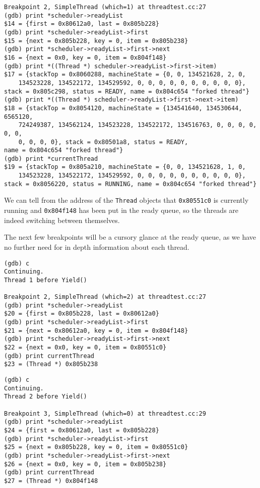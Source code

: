 \documentclass[letterpaper, 10pt]{article}
\begin{document}
\begin{enumerate}
{\begin{verbatim}
Breakpoint 2, SimpleThread (which=1) at threadtest.cc:27
(gdb) print *scheduler->readyList
$14 = {first = 0x80612a0, last = 0x805b228}
(gdb) print *scheduler->readyList->first
$15 = {next = 0x805b228, key = 0, item = 0x805b238}
(gdb) print *scheduler->readyList->first->next
$16 = {next = 0x0, key = 0, item = 0x804f148}
(gdb) print *((Thread *) scheduler->readyList->first->item)
$17 = {stackTop = 0x8060288, machineState = {0, 0, 134521628, 2, 0,
	134523228, 134522172, 134529592, 0, 0, 0, 0, 0, 0, 0, 0, 0, 0},
stack = 0x805c298, status = READY, name = 0x804c654 "forked thread"}
(gdb) print *((Thread *) scheduler->readyList->first->next->item)
$18 = {stackTop = 0x8054120, machineState = {134541640, 134530644, 6565120,
	724249387, 134562124, 134523228, 134522172, 134516763, 0, 0, 0, 0, 0, 0,
	0, 0, 0, 0}, stack = 0x80501a8, status = READY,
name = 0x804c654 "forked thread"}
(gdb) print *currentThread
$19 = {stackTop = 0x805a210, machineState = {0, 0, 134521628, 1, 0,
	134523228, 134522172, 134529592, 0, 0, 0, 0, 0, 0, 0, 0, 0, 0},
stack = 0x8056220, status = RUNNING, name = 0x804c654 "forked thread"}
	\end{verbatim}

	We can tell from the address of the {\tt Thread} objects that {\tt 0x80551c0} is currently running and {\tt 0x804f148} has been put in the ready queue, so the threads are indeed switching between themselves.

	The next few breakpoints will be a cursory glance at the ready queue, as we have no further need for in depth information about each thread.

	\begin{verbatim}
(gdb) c
Continuing.
Thread 1 before Yield()

Breakpoint 2, SimpleThread (which=2) at threadtest.cc:27
(gdb) print *scheduler->readyList
$20 = {first = 0x805b228, last = 0x80612a0}
(gdb) print *scheduler->readyList->first
$21 = {next = 0x80612a0, key = 0, item = 0x804f148}
(gdb) print *scheduler->readyList->first->next
$22 = {next = 0x0, key = 0, item = 0x80551c0}
(gdb) print currentThread
$23 = (Thread *) 0x805b238
	\end{verbatim}

	\begin{verbatim}
(gdb) c
Continuing.
Thread 2 before Yield()

Breakpoint 3, SimpleThread (which=0) at threadtest.cc:29
(gdb) print *scheduler->readyList
$24 = {first = 0x80612a0, last = 0x805b228}
(gdb) print *scheduler->readyList->first
$25 = {next = 0x805b228, key = 0, item = 0x80551c0}
(gdb) print *scheduler->readyList->first->next
$26 = {next = 0x0, key = 0, item = 0x805b238}
(gdb) print currentThread
$27 = (Thread *) 0x804f148
	\end{verbatim}

}
\end{enumerate}
\end{document}
